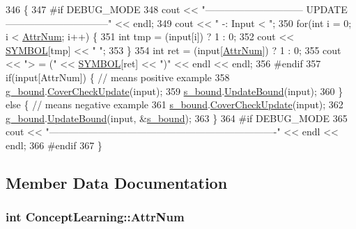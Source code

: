 \begin{DoxyCode}
346                                                     \{
347 \textcolor{preprocessor}{#if DEBUG\_MODE}
348 \textcolor{preprocessor}{}    cout << \textcolor{stringliteral}{"------------------------------ UPDATE --------------------------------"} << endl;
349     cout << \textcolor{stringliteral}{" -: Input < "};
350     \textcolor{keywordflow}{for}(\textcolor{keywordtype}{int} i = 0; i < \hyperlink{class_concept_learning_ae6bebaccc7f80436856e5ec539feb04c}{AttrNum}; i++) \{
351         \textcolor{keywordtype}{int} tmp = (input[i]) ? 1 : 0;
352         cout << \hyperlink{concept_8cpp_a6a0fcd5aed2dc21ce5f79cbe7c3a8e2f}{SYMBOL}[tmp] << \textcolor{stringliteral}{" "};
353     \}
354     \textcolor{keywordtype}{int} ret = (input[\hyperlink{class_concept_learning_ae6bebaccc7f80436856e5ec539feb04c}{AttrNum}]) ? 1 : 0;
355     cout << \textcolor{stringliteral}{"> = ("} << \hyperlink{concept_8cpp_a6a0fcd5aed2dc21ce5f79cbe7c3a8e2f}{SYMBOL}[ret] << \textcolor{stringliteral}{")"} << endl << endl;
356 \textcolor{preprocessor}{#endif}
357 \textcolor{preprocessor}{}    \textcolor{keywordflow}{if}(input[AttrNum]) \{    \textcolor{comment}{// means positive example}
358         \hyperlink{class_concept_learning_a449a58ac04e18fd981b2e6bf984fd764}{g\_bound}.\hyperlink{class_g___bound_a9344fe22bb13d39a425c5a5b690aace4}{CoverCheckUpdate}(input);
359         \hyperlink{class_concept_learning_a8ac1de9ab4694d91cffabda42443a96e}{s\_bound}.\hyperlink{class_s___bound_a1391ba6c3f3fab3fd5fa57ecf8e1e66a}{UpdateBound}(input);
360     \} \textcolor{keywordflow}{else} \{    \textcolor{comment}{// means negative example}
361         \hyperlink{class_concept_learning_a8ac1de9ab4694d91cffabda42443a96e}{s\_bound}.\hyperlink{class_s___bound_aee5a88ab73dd09ac42953b6f3545dfe2}{CoverCheckUpdate}(input);
362         \hyperlink{class_concept_learning_a449a58ac04e18fd981b2e6bf984fd764}{g\_bound}.\hyperlink{class_g___bound_a8b473f262762ac5b74fdb766ded033aa}{UpdateBound}(input, &\hyperlink{class_concept_learning_a8ac1de9ab4694d91cffabda42443a96e}{s\_bound});
363     \}
364 \textcolor{preprocessor}{#if DEBUG\_MODE}
365 \textcolor{preprocessor}{}    cout << \textcolor{stringliteral}{"----------------------------------------------------------------------"} << endl << endl;
366 \textcolor{preprocessor}{#endif}
367 \textcolor{preprocessor}{}\}
\end{DoxyCode}


\subsection{Member Data Documentation}
\hypertarget{class_concept_learning_ae6bebaccc7f80436856e5ec539feb04c}{
\subsubsection[{Attr\-Num}]{\setlength{\rightskip}{0pt plus 5cm}int Concept\-Learning\-::\-Attr\-Num\hspace{0.3cm}{\ttfamily [private]}}}\label{class_concept_learning_ae6bebaccc7f80436856e5ec539feb04c}



